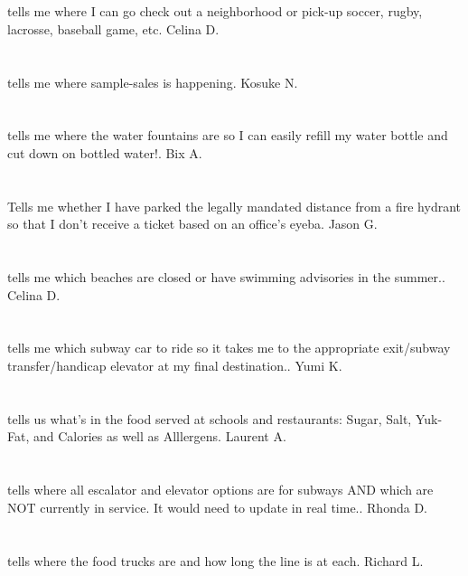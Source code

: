 \section{}tells me where I can go check out a neighborhood or pick-up soccer,  rugby,  lacrosse,  baseball game,  etc. Celina D.
\section{}tells me where sample-sales is happening. Kosuke N.
\section{}tells me where the water fountains are so I can easily refill my water bottle and cut down on bottled water!. Bix A.
\section{}Tells me whether I have parked the legally mandated distance from a fire hydrant so that I don't receive a ticket based on an office's eyeba. Jason G.
\section{}tells me which beaches are closed or have swimming advisories in the summer.. Celina D.
\section{}tells me which subway car to ride so it takes me to the appropriate exit/subway transfer/handicap elevator at my final destination.. Yumi K.
\section{}tells us what's in the food served at schools and restaurants: Sugar,  Salt,  Yuk-Fat,  and Calories as well as Alllergens. Laurent A.
\section{}tells where all escalator and elevator options are for subways AND which are NOT currently in service. It would need to update in real time.. Rhonda D.
\section{}tells where the food trucks are and how long the line is at each. Richard L.
